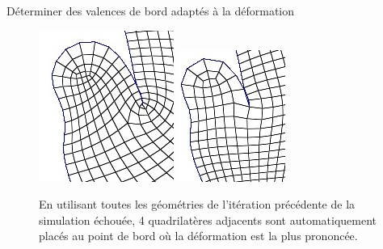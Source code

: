 \begin{frame}{Déterminer des valences de bord adaptés à la déformation}
    \small
    \begin{figure}
        \centering
        \includegraphics[width=0.39\linewidth]{img/quadsimu/coin_rs_0.PNG}
        \includegraphics[width=0.35\linewidth]{img/quadsimu/coin_rs_1.PNG}
        \caption{En utilisant toutes les géométries de l'itération précédente de la simulation échouée, 4 quadrilatères adjacents sont automatiquement placés au 
        point de bord où la déformation est la plus prononcée.}
        \label{fig:asp_ratio_sol}
    \end{figure}
\end{frame}

